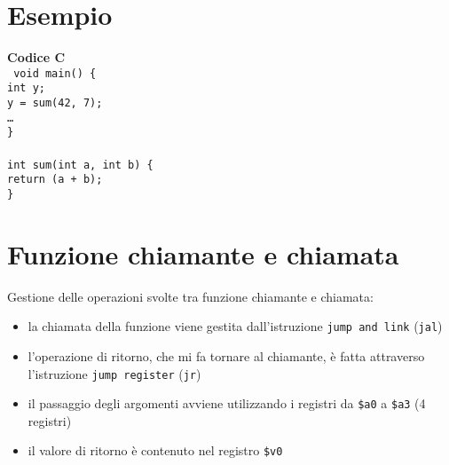 \documentclass[../main.tex]{subfiles}
\begin{document}
\noindent
\begin{table}[h!]
    \begin{minipage}{.02\linewidth}
        \hspace*{0cm}
    \end{minipage}
    \begin{minipage}{.2\linewidth}
        \section*{Esempio}
    \end{minipage}
    \begin{minipage}{.5\linewidth}
        \textbf{Codice C} \\
        \texttt{
            void main() \{ \\
            \hspace*{0cm} \hspace*{0cm} \hspace*{0cm} \hspace*{0cm} int y; \\
            \hspace*{0cm} \hspace*{0cm} \hspace*{0cm} \hspace*{0cm} y = sum(42, 7); \\
            \hspace*{0cm} \hspace*{0cm} \hspace*{0cm} \hspace*{0cm} \dots \\
            \} \\
            \\
            int sum(int a, int b) \{ \\
            \hspace*{0cm} \hspace*{0cm} \hspace*{0cm} \hspace*{0cm} return (a + b); \\
            \} \\
        }
    \end{minipage}
\end{table}

\section{Funzione chiamante e chiamata}
Gestione delle operazioni svolte tra funzione chiamante e chiamata:
\begin{itemize}
    \item la chiamata della funzione viene gestita dall'istruzione \texttt{jump and link} (\texttt{jal})
    \item l'operazione di ritorno, che mi fa tornare al chiamante,
    è fatta attraverso l'istruzione \texttt{jump register} (\texttt{jr})
    \item il passaggio degli argomenti avviene utilizzando i registri da
    \texttt{\$a0} a \texttt{\$a3} (4 registri)
    \item il valore di ritorno è contenuto nel registro \texttt{\$v0}
\end{itemize}
\end{document}
